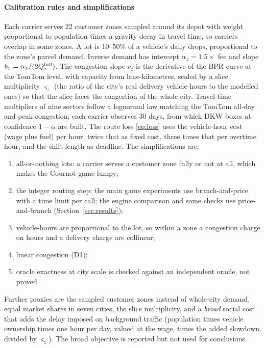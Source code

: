 \documentclass[preprint,12pt]{elsarticle}
\theoremstyle{definition}
\theoremstyle{remark}
\begin{document}
\paragraph{Calibration rules and simplifications} Each carrier serves 22 customer zones sampled around its depot with weight proportional to population times a gravity decay in travel time, so carriers overlap in some zones. A lot is 10--50\% of a vehicle's daily drops, proportional to the zone's parcel demand. Inverse demand has intercept $\alpha_z=1.5\times$ fee and slope $b_z=\alpha_z/(2Q_z^{\rm full})$. The congestion slope $c_z$ is the derivative of the BPR curve at the TomTom level, with capacity from lane-kilometres, scaled by a slice multiplicity $\varsigma_z$ (the ratio of the city's real delivery vehicle-hours to the modelled ones) so that the slice faces the congestion of the whole city. Travel-time multipliers of nine sectors follow a lognormal law matching the TomTom all-day and peak congestion; each carrier observes 30 days, from which DKW boxes at confidence $1-\alpha$ are built. The route loss \eqref{eq:loss} uses the vehicle-hour cost (wage plus fuel) per hour, twice that as fixed cost, three times that per overtime hour, and the shift length as deadline. The simplifications are:
\begin{enumerate}[label=(S\arabic*),leftmargin=*,itemsep=0pt]
\item all-or-nothing lots: a carrier serves a customer zone fully or not at all, which makes the Cournot game lumpy;
\item the integer routing step: the main game experiments use branch-and-price with a time limit per call; the engine comparison and some checks use price-and-branch (Section~\ref{sec:results});
\item vehicle-hours are proportional to the lot, so within a zone a congestion charge on hours and a delivery charge are collinear;
\item linear congestion (D1);
\item oracle exactness at city scale is checked against an independent oracle, not proved.
\end{enumerate}
Further proxies are the sampled customer zones instead of whole-city demand, equal market shares in seven cities, the slice multiplicity, and a \emph{broad} social cost that adds the delay imposed on background traffic (population times vehicle ownership times one hour per day, valued at the wage, times the added slowdown, divided by $\varsigma_z$). The broad objective is reported but not used for conclusions.
\end{document}
